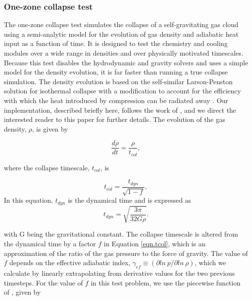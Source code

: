 \subsubsection{One-zone collapse test}
\label{sec.tests.1-zone}

The one-zone collapse test simulates the collapse of a
self-gravitating gas cloud using a semi-analytic model for the
evolution of gas density and adiabatic heat input as a function of
time.  It is designed to test the chemistry and cooling modules over a
wide range in densities and over physically motivated timescales.
Because this test disables the hydrodynamic and gravity solvers and
uses a simple model for the density evolution, it is far faster than
running a true collapse simulation.  The density evolution is based on
the self-similar Larson-Penston \citep{1969MNRAS.145..271L,
1969MNRAS.144..425P} solution for isothermal collapse with a
modification to account for the efficiency with which the heat
introduced by compression can be radiated away
\citep{1983ApJ...265.1047Y}.  Our implementation, described briefly
here, follows the work of \citet{2005ApJ...626..627O}, and we direct
the interested reader to this paper for further details.  The
evolution of the gas density, $\rho$, is given by

\begin{equation}
\frac{d\rho}{dt} = \frac{\rho}{t_{col}},
\end{equation}

where the collapse timescale, $t_{col}$, is

\begin{equation} \label{eqn.tcol}
t_{col} = \frac{t_{dyn}}{\sqrt{1 - f}},
\end{equation}
In this equation, $t_{dyn}$ is the dynamical time and is expressed as
\begin{equation}
t_{dyn} = \sqrt{\frac{3 \pi}{32 G \rho}}.
\end{equation}

with G being the gravitational constant.  The collapse timescale is
altered from the dynamical time by a factor $f$ in Equation
\ref{eqn.tcol}, which is an approximation of the ratio of the gas
pressure to the force of gravity.  The value of $f$ depends on the
effective adiabatic index, $\gamma_{ef} \equiv (\partial ln\ p
/ \partial ln\ \rho)$, which we calculate by linearly extrapolating
from derivative values for the two previous timesteps.  For the value
of $f$ in this test problem, we use the piecewise function of
\citet{2005ApJ...626..627O}, given by

